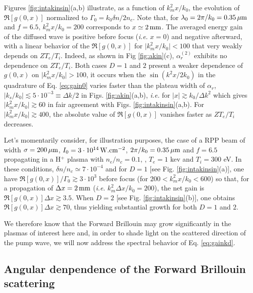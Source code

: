 \documentclass[
 reprint,
 amsmath,amssymb,
 aps,
]{revtex4-1}
\begin{document}
Figures \ref{fig:intakinsin}(a,b) illustrate, as a function of $k_m^2 x /k_0$, the evolution of $\Re[g(0,x)]$
normalized to $\Gamma_0=k_0\delta n / 2n_c$. Note that, for $\lambda_0=2\pi/k_0=0.35\,\rm\mu m$ and $f=6.5$,  $k_m^2 x /k_0=200$ corresponds to $x\simeq 2\,\rm mm$. 
The averaged energy gain of the diffused wave is positive before focus (\emph{i.e.} $x=0$) and negative afterward, with  a linear behavior of the $\Re[g(0,x)]$ for  $\vert k_m^2 x /k_0 \vert < 100$  that very weakly depends on $ZT_e/T_i$.  Indeed, as shown in Fig \ref{fig:akin}(c), $\alpha_r^{(2)}$ exhibits no dependence  on $ZT_e/T_i$. Both cases $D=1$ and $2$ present a weaker dependence of $g(0,x)$ on $\vert k_m^2 x /k_0 \vert > 100$, it occurs when the $\sin(k^2x/2k_0)$ in the quadrature of Eq. \eqref{eq:gain0} varies faster than the plateau width of $\alpha_r$, $\vert k_s/k_0\vert \lesssim 5\cdot 10^{-3}\equiv \Delta k /2$ in Figs. \ref{fig:akin}(a,b), \emph{i.e.} for $\vert x\vert \gtrsim k_0/\Delta k^2$ which gives $\vert k_m^2x/k_0 \vert  \gtrsim 60  $ in fair  agreement with Figs. \ref{fig:intakinsin}(a,b).
For $\vert k_m^2 x /k_0 \vert \gtrsim 400$, the absolute value of $\Re[g(0,x)]$ vanishes faster as $ZT_e/T_i$ decreases. 

Let's momentarily consider, for illustration purposes,  the  case of a RPP beam of width $\sigma =200\,\rm\mu m$, $I_0=3\cdot 10^{14} \,\rm W.cm^{-2}$, $2\pi/k_0 = 0.35\,\rm\mu m$ and $f = 6.5$ propagating in a H$^{+}$ plasma with $n_e/n_c=0.1$, , $T_e=1$ kev and $T_i=300$ eV. In these conditions, $\delta n/n_c \simeq 7\cdot 10^{-4}$ and  for $D=1$ [see Fig. \ref{fig:intakinsin}(a)], one have $\Re[g(0,x)]/\Gamma_0 \gtrsim 3\cdot 10^3$ before focus (for $200< k_m^2 x/k_0 < 600$) so that, for  a propagation of $\Delta x = 2\,\rm mm$ (\emph{i.e.} $k_m^2 \Delta x/k_0 = 200$), the net gain is $\Re[g(0,x)]\Delta x\gtrsim 3.5 $. When $D=2$ [see Fig. \ref{fig:intakinsin}(b)], one obtains $\Re[g(0,x)]\Delta x\gtrsim 70 $, thus yielding substantial growth for both $D=1$ and $2$.

We therefore know that the Forward Brillouin may grow significantly in the plasmas  of interest here and, in order to shade light on the scattered  direction of the pump wave, we will now address the spectral behavior of Eq. \eqref{eq:gainkd}.

\subsection{Angular denpendence of the  Forward Brillouin scattering}
\end{document}

